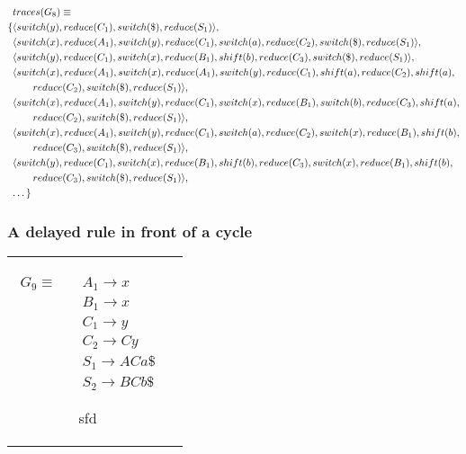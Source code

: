 \documentclass[11pt]{article}
\begin{document}
\parbox{.3\textwidth}{\begin{align*}
&traces(G_8) \equiv \\
\{ & \langle switch(y), reduce(C_1), switch(\$), reduce(S_1) \rangle,\\
   & \langle switch(x), reduce(A_1), switch(y), reduce(C_1), switch(a), reduce(C_2), switch(\$), reduce(S_1) \rangle,\\
   & \langle switch(y), reduce(C_1), switch(x), reduce(B_1), shift(b), reduce(C_3), switch(\$), reduce(S_1) \rangle,\\
   & \langle switch(x), reduce(A_1), switch(x), reduce(A_1), switch(y), reduce(C_1), shift(a), reduce(C_2), shift(a), \\&\qquad reduce(C_2), switch(\$), reduce(S_1) \rangle,\\
   & \langle switch(x), reduce(A_1), switch(y), reduce(C_1), switch(x), reduce(B_1), switch(b), reduce(C_3), shift(a), \\&\qquad reduce(C_2), switch(\$), reduce(S_1) \rangle,\\
   & \langle switch(x), reduce(A_1), switch(y), reduce(C_1), switch(a), reduce(C_2), switch(x), reduce(B_1), shift(b), \\&\qquad reduce(C_3), switch(\$), reduce(S_1) \rangle,\\
   & \langle switch(y), reduce(C_1), switch(x), reduce(B_1), shift(b), reduce(C_3), switch(x), reduce(B_1), shift(b), \\&\qquad reduce(C_3), switch(\$), reduce(S_1) \rangle,\\
   & \textellipsis \}
\end{align*}}




\subsubsection{A delayed rule in front of a cycle}
\begin{tabular}[t]{cl}
\parbox{.3\textwidth}{
\begin{align*}
G_9 \equiv \quad & A_1 \rightarrow x\\
                 & B_1 \rightarrow x\\
                 & C_1 \rightarrow y\\
                 & C_2 \rightarrow C y\\
                 & S_1 \rightarrow A C a \$\\
                 & S_2 \rightarrow B C b \$
\end{align*}}
\parbox{.8\textwidth}{sfd}
\end{tabular}
\end{document}
